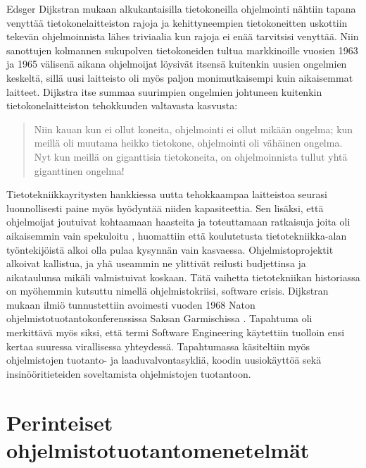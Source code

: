 \documentclass[finnish,12pt]{tktltiki2}
\theoremstyle{definition}
\theoremstyle{remark}
\begin{document}
Edsger Dijkstran mukaan alkukantaisilla tietokoneilla ohjelmointi nähtiin tapana venyttää tietokonelaitteiston rajoja ja kehittyneempien tietokoneitten uskottiin tekevän ohjelmoinnista lähes triviaalia kun rajoja ei enää tarvitsisi venyttää. \cite{Dijkstra:1979:HP:1241515.1241525} Niin sanottujen kolmannen sukupolven tietokoneiden tultua markkinoille vuosien 1963 ja 1965 välisenä aikana ohjelmoijat löysivät itsensä kuitenkin uusien ongelmien keskeltä, sillä uusi laitteisto oli myös paljon monimutkaisempi kuin aikaisemmat laitteet. Dijkstra itse summaa suurimpien ongelmien johtuneen kuitenkin tietokonelaitteiston tehokkuuden valtavasta kasvusta: \begin{quote}
Niin kauan kun ei ollut koneita, ohjelmointi ei ollut mikään ongelma; kun meillä oli muutama heikko tietokone, ohjelmointi oli vähäinen ongelma. Nyt kun meillä on giganttisia tietokoneita, on ohjelmoinnista tullut yhtä giganttinen ongelma! \cite{Dijkstra:1979:HP:1241515.1241525}
\end{quote} Tietotekniikkayritysten hankkiessa uutta tehokkaampaa laitteistoa seurasi luonnollisesti paine myös hyödyntää niiden kapasiteettia. Sen lisäksi, että ohjelmoijat joutuivat kohtaamaan haasteita ja toteuttamaan ratkaisuja joita oli aikaisemmin vain spekuloitu \cite{Dijkstra:1979:HP:1241515.1241525}, huomattiin että koulutetusta tietotekniikka-alan työntekijöistä alkoi olla pulaa kysynnän vain kasvaessa. \cite{DBLP:reference/se/Grier10} Ohjelmistoprojektit alkoivat kallistua, ja yhä useammin ne ylittivät reilusti budjettinsa ja aikataulunsa mikäli valmistuivat koskaan.\cite{CHAOS1994} Tätä vaihetta tietotekniikan historiassa on myöhemmin kutsuttu nimellä ohjelmistokriisi, software crisis. Dijkstran mukaan ilmiö tunnustettiin avoimesti vuoden 1968 Naton ohjelmistotuotantokonferenssissa Saksan Garmischissa \cite{Dijkstra:1979:HP:1241515.1241525}. Tapahtuma oli merkittävä myös siksi, että termi Software Engineering käytettiin tuolloin ensi kertaa suuressa virallisessa yhteydessä. Tapahtumassa käsiteltiin myös ohjelmistojen tuotanto- ja laaduvalvontasykliä, koodin uusiokäyttöä sekä insinööritieteiden soveltamista ohjelmistojen tuotantoon. \cite{DBLP:reference/se/Grier10}



\section{Perinteiset ohjelmistotuotantomenetelmät}
\end{document}
